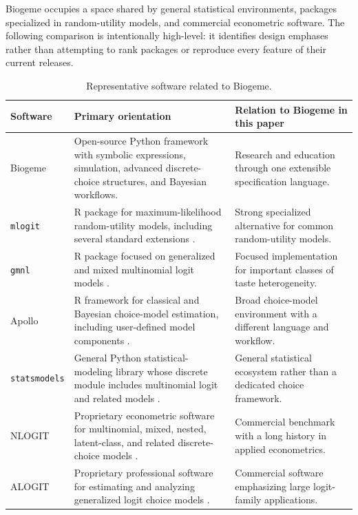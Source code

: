 \documentclass[11pt]{article}
\begin{document}
Biogeme occupies a space shared by general statistical environments, packages
specialized in random-utility models, and commercial econometric software. The
following comparison is intentionally high-level: it identifies design
emphases rather than attempting to rank packages or reproduce every feature
of their current releases.

\begin{table}[htbp]
  \centering
  \caption{Representative software related to Biogeme.}
  \label{tab:state-field}
  \begin{tabularx}{\textwidth}{@{}lYY@{}}
    \toprule
    Software & Primary orientation & Relation to Biogeme in this paper \\
    \midrule
    Biogeme & Open-source Python framework with symbolic expressions,
      simulation, advanced discrete-choice structures, and Bayesian workflows. &
      Research and education through one extensible specification language. \\
    \texttt{mlogit} & R package for maximum-likelihood random-utility models,
      including several standard extensions \citep{Croissant2020}. &
      Strong specialized alternative for common random-utility models. \\
    \texttt{gmnl} & R package focused on generalized and mixed multinomial
      logit models \citep{SarriasDaziano2017}. &
      Focused implementation for important classes of taste heterogeneity. \\
    Apollo & R framework for classical and Bayesian choice-model estimation,
      including user-defined model components \citep{HessPalma2019}. &
      Broad choice-model environment with a different language and workflow. \\
    \texttt{statsmodels} & General Python statistical-modeling library whose
      discrete module includes multinomial logit and related models
      \citep{SeaboldPerktold2010}. &
      General statistical ecosystem rather than a dedicated choice framework. \\
    NLOGIT & Proprietary econometric software for multinomial, mixed, nested,
      latent-class, and related discrete-choice models \citep{NLOGIT2025}. &
      Commercial benchmark with a long history in applied econometrics. \\
    ALOGIT & Proprietary professional software for estimating and analyzing
      generalized logit choice models \citep{ALOGIT2025}. &
      Commercial software emphasizing large logit-family applications. \\
    \bottomrule
  \end{tabularx}
\end{table}
\end{document}
